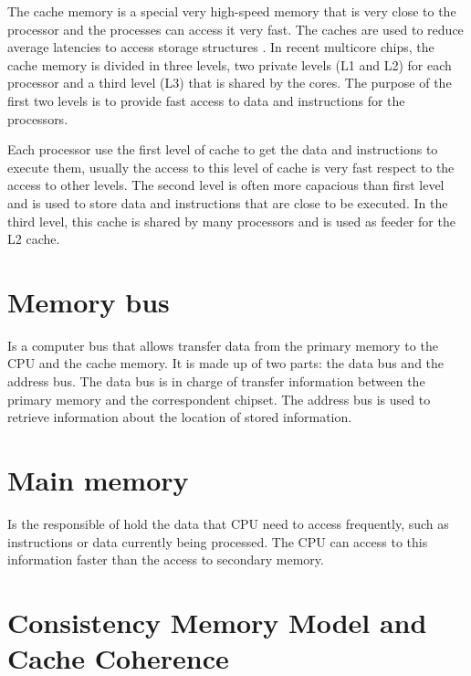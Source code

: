 \documentclass[openany, a4paper]{book}
\theoremstyle{break}
\theoremstyle{example}
\theoremstyle{note}
\theoremstyle{break}
\theoremstyle{exercise}
\begin{document}
The cache memory is a special very high-speed memory that is very close to
the processor and the processes can access it very fast. The caches are used
to reduce average latencies to access storage structures
\cite{DBLP_series_synthesis_2020Nagarajan}. In recent multicore chips, the
cache memory is divided in three levels, two private levels (L1 and L2) for
each processor and a third level (L3) that is shared by the cores. The
purpose of the first two levels is to provide fast access to data and
instructions for the processors.

Each processor use the first level of cache to get the data and instructions
to execute them, usually the access to this level of cache is very fast
respect to the access to other levels.  The second level is often more
capacious than first level and is used to store data and instructions that
are close to be executed. In the third level, this cache is shared by many
processors and is used as feeder for the L2 cache.

\section{Memory bus}
\label{sec:orgb345c60}

Is a computer bus that allows transfer data from the primary memory to the
CPU and the cache memory. It is made up of two parts: the data bus and the
address bus. The data bus is in charge of transfer information between the
primary memory and the correspondent chipset.
The address bus is used to retrieve information about the location of stored
information.


\section{Main memory}
\label{sec:org81a6414}

Is the responsible of hold the data that CPU need to access frequently, such
as instructions or data currently being processed. The CPU can access to
this information faster than the access to secondary memory.

\section{Consistency Memory Model and Cache Coherence}
\label{sec:orgd7aedb1}
\end{document}
